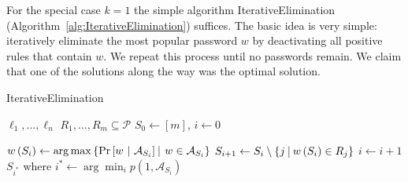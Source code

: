 \documentclass[prodmode,acmec]{ec-acmsmall}
\newcommand{\PasswordSpace}{\mathcal{P}}
\begin{document}
For the special case $k=1$ the simple algorithm IterativeElimination (Algorithm~\ref{alg:IterativeElimination}) suffices. The basic idea is very simple: iteratively eliminate the most popular password $w$ by deactivating all positive rules that contain $w$. We repeat this process until no passwords remain. We claim that one of the solutions along the way was the optimal solution.




\begin{algorithm}
\caption{IterativeElimination}
\begin{algorithmic}
 $\ell_1,...,\ell_n$
 $R_1,...,R_m \subseteq \PasswordSpace$
 $S_0 \gets [m]$, $i \gets 0$

\State $w\left(S_i\right) \gets \arg\max \left\{\Pr\left[w ~|~\mathcal{A}_{S_i}\right]  ~\vline~  w \in \mathcal{A}_{S_i}\right\}$
\State $S_{i+1} \gets S_i \setminus \left\{j~\vline~w\left(S_i\right) \in R_j \right\}$ 
\State $i \gets i+1$
\EndWhile
\Return $S_{i^*}$ where $i^* \gets \arg\min_i p\left(1,\mathcal{A}_{S_i}\right)$
\end{algorithmic}
\label{alg:IterativeElimination}
\end{algorithm}
\end{document}
